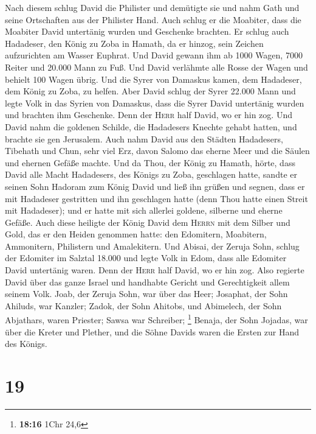  Nach diesem schlug David die Philister und demütigte sie
und nahm Gath und seine Ortschaften aus der Philister Hand.
 Auch schlug er die Moabiter, dass die Moabiter David
untertänig wurden und Geschenke brachten.  Er schlug auch
Hadadeser, den König zu Zoba in Hamath, da er hinzog, sein Zeichen
aufzurichten am Wasser Euphrat.  Und David gewann ihm ab
1000 Wagen, 7000 Reiter und 20.000 Mann zu Fuß. Und David verlähmte alle
Rosse der Wagen und behielt 100 Wagen übrig.  Und die
Syrer von Damaskus kamen, dem Hadadeser, dem König zu Zoba, zu helfen.
Aber David schlug der Syrer 22.000 Mann  und legte Volk in
das Syrien von Damaskus, dass die Syrer David untertänig wurden und
brachten ihm Geschenke. Denn der \textsc{Herr} half David, wo er hin
zog.  Und David nahm die goldenen Schilde, die Hadadesers
Knechte gehabt hatten, und brachte sie gen Jerusalem. 
Auch nahm David aus den Städten Hadadesers, Tibehath und Chun, sehr viel
Erz, davon Salomo das eherne Meer und die Säulen und ehernen Gefäße
machte.  Und da Thou, der König zu Hamath, hörte, dass
David alle Macht Hadadesers, des Königs zu Zoba, geschlagen hatte,
 sandte er seinen Sohn Hadoram zum König David und ließ
ihn grüßen und segnen, dass er mit Hadadeser gestritten und ihn
geschlagen hatte (denn Thou hatte einen Streit mit Hadadeser); und er
hatte mit sich allerlei goldene, silberne und eherne Gefäße.
 Auch diese heiligte der König David dem \textsc{Herrn}
mit dem Silber und Gold, das er den Heiden genommen hatte: den
Edomitern, Moabitern, Ammonitern, Philistern und Amalekitern.
 Und Abisai, der Zeruja Sohn, schlug der Edomiter im
Salztal 18.000  und legte Volk in Edom, dass alle
Edomiter David untertänig waren. Denn der \textsc{Herr} half David, wo
er hin zog.  Also regierte David über das ganze Israel
und handhabte Gericht und Gerechtigkeit allem seinem Volk.
 Joab, der Zeruja Sohn, war über das Heer; Josaphat, der
Sohn Ahiluds, war Kanzler;  Zadok, der Sohn Ahitobs, und
Abimelech, der Sohn Abjathars, waren Priester; Sawsa war Schreiber;
\footnote{\textbf{18:16} 1Chr 24,6}  Benaja, der Sohn
Jojadas, war über die Kreter und Plether, und die Söhne Davids waren die
Ersten zur Hand des Königs.

\hypertarget{section-18}{%
\section{19}\label{section-18}}

